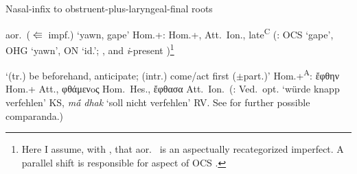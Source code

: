 \documentclass[output=paper,colorlinks,citecolor=brown]{langscibook}
\begin{document}
\begin{exe}
    \ex Nasal-infix to obstruent-plus-laryngeal-final roots
    \begin{xlist}
    \ex    aor.\ ($\Lleftarrow$ impf.)  ‘yawn, gape’ Hom.+:  Hom.+,   Att.\ Ion.,   late\textsuperscript{C}  (: OCS  ‘gape', OHG  ‘yawn', ON  ‘id.’; ,  and \textit{i}-present )\footnote{Here I assume, with , that aor.\  is an aspectually recategorized imperfect. A parallel shift is responsible for  aspect of OCS .}

\ex {}  ‘(tr.) be beforehand,  anticipate; (intr.) come/act first ($\pm$part.)’ Hom.+\textsuperscript{A}: ἔφθην Hom.+ Att., φθάμενoς  Hom.\ Hes., ἔφθασα Att.\ Ion.\  (: Ved.\ opt.  ‘würde knapp verfehlen’ KS, \textit{m{ā́} dhak} ‘soll nicht verfehlen’ RV. See   for further possible comparanda.)
    \end{xlist}

\end{exe} 
\end{document}
